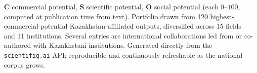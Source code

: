 \documentclass[10pt]{article}
\begin{document}
\vspace{4pt}
\footnotesize
\textbf{C} commercial potential, \textbf{S} scientific potential, \textbf{O} social
potential (each $0$--$100$, computed at publication time from text). Portfolio
drawn from 120 highest-commercial-potential Kazakhstan-affiliated
outputs, diversified across 15 fields and
11 institutions. Several entries are international
collaborations led from or co-authored with Kazakhstani institutions. Generated
directly from the \texttt{scientifiq.ai} API; reproducible and continuously
refreshable as the national corpus grows.
\end{document}

